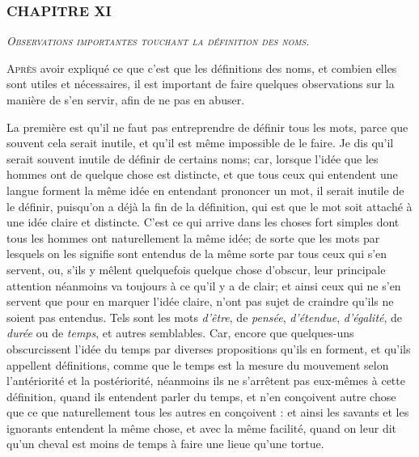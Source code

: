 \subsubsection{\centering \Large CHAPITRE XI}
\begin{center}\emph{\large\scshape Observations importantes touchant la définition des noms.}\end{center}

	\lettrine{A}{près} avoir expliqué ce que c'est que les définitions des noms, et combien elles sont utiles et nécessaires, il est important de faire quelques observations sur la manière de s'en servir, afin de ne pas en abuser.

La première est qu'il ne faut pas entreprendre de définir tous les mots, parce que souvent cela serait inutile, et qu'il est même impossible de le faire. Je dis qu'il serait souvent inutile de définir de certains noms; car, lorsque l'idée que les hommes ont de quelque chose est distincte, et que tous ceux qui entendent une langue forment la même idée en entendant prononcer un mot, il serait inutile de le définir, puisqu'on a déjà la fin de la définition, qui est que le mot soit attaché à une idée claire et distincte. C'est ce qui arrive dans les choses fort simples dont tous les hommes ont naturellement la même idée; de sorte que les mots par lesquels on les signifie sont entendus de la même sorte par tous ceux qui s'en servent, ou, s'ils y mêlent quelquefois quelque chose d'obscur, leur principale attention néanmoins va toujours à ce qu'il y a de clair; et ainsi ceux qui ne s'en servent que pour en marquer l'idée claire, n'ont pas sujet de craindre qu'ils ne soient pas entendus. Tels sont les mots \emph{d'être}, de \emph{pensée}, \emph{d'étendue}, \emph{d'égalité}, de \emph{durée} ou de \emph{temps}, et autres semblables. Car, encore que quelques-uns obscurcissent l'idée du temps par diverses propositions qu'ils en forment, et qu'ils appellent définitions, comme que le temps est la mesure du mouvement selon l'antériorité et la postériorité, néanmoins ils ne s'arrêtent pas eux-mêmes à cette définition, quand ils entendent parler du temps, et n'en conçoivent autre chose que ce que naturellement tous les autres en conçoivent : et ainsi les savants et les ignorants entendent la même chose, et avec la même facilité, quand on leur dit qu'un cheval est moins de temps à faire une lieue qu'une tortue.

